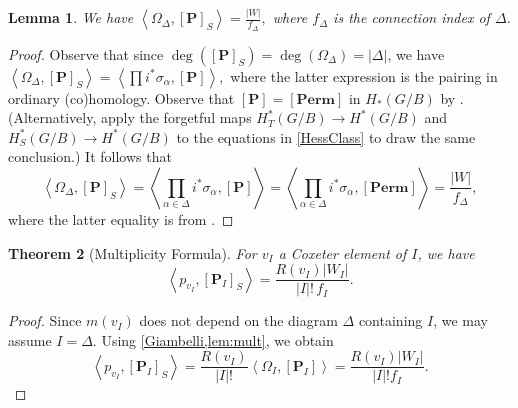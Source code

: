 \documentclass[10pt]{article}
\newtheorem{thm}{Theorem}
\numberwithin{thm}{section}
\newtheorem{lemma}[thm]{Lemma}
\newtheorem{cor}[thm]{Corollary}
\theoremstyle{definition}
\theoremstyle{remark}
\newcommand{\Pet}{\ensuremath{\mathbf{P}}}
\newcommand{\Perm}{\ensuremath{\mathbf{Perm}}}
\newcommand{\Fl}{\ensuremath{G/B}}
\newcommand{\IZ}{\mathbb Z}
\newcommand{\set}[2]{\left\{#1\,\middle\vert\,#2\right\}}
\begin{document}
\begin{lemma}
\label{lem:mult}
We have 
$
\left\langle\Omega_\Delta,[\Pet]_S\right\rangle=\frac{|W|}{f_\Delta},
$
where $f_\Delta$ is the connection index of $\Delta$.
\end{lemma}
\begin{proof}
Observe that since $\deg\left([\Pet]_S\right)=\deg\left(\Omega_\Delta\right)=|\Delta|$,
we have 
$
\left\langle\Omega_\Delta,[\Pet]_S\right\rangle=
\left\langle\prod i^*\sigma_{\alpha},[\Pet]\right\rangle,
$
where the latter expression is the pairing in ordinary (co)homology.  Observe that  $[\Pet]=[\Perm]$ in $H_*(\Fl)$ by \cite{abe.fujita.zeng}. (Alternatively, apply
 the forgetful maps $H^*_T(G/B)\to H^*(G/B)$ and $H^*_S(G/B)\to H^*(G/B)$ to the equations in \cref{HessClass} to draw the same conclusion.)
It follows that
\begin{equation*}
\left\langle\Omega_\Delta,[\Pet]_S\right\rangle=
\left\langle\prod_{\alpha\in\Delta} i^*\sigma_\alpha,[\Pet]\right\rangle=
\left\langle\prod_{\alpha\in\Delta} i^*\sigma_\alpha,[\Perm]\right\rangle=\frac{|W|}{f_\Delta},
\end{equation*}
where the latter equality is from \cite[Thm 3]{klyachko85}.
\end{proof}


\begin{thm}[Multiplicity Formula]
\label{thm:mult}
For $v_I$ a Coxeter element of $I$,
we have
\begin{equation*}
\left\langle p_{v_I},[\Pet_I]_S\right\rangle=\frac{R(v_I)|W_I|}{|I|!\,f_I}.
\end{equation*}
\end{thm}
\begin{proof}
Since $m(v_I)$ does not depend on the diagram $\Delta$ containing $I$,
we may assume $I=\Delta$.
%
Using \cref{Giambelli,lem:mult}, we obtain
\begin{equation*}
\left\langle p_{v_I},[\Pet_I]_S\right\rangle
=\frac{R(v_I)}{|I |!}\left\langle\Omega_I ,[\Pet_I]\right\rangle=\frac{R(v_I)|W_I|}{|I |!f_I}.
\end{equation*}
\end{proof}
\end{document}
